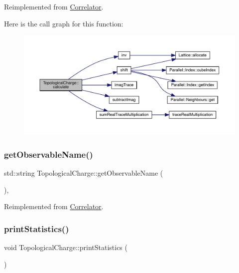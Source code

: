 Reimplemented from \mbox{\hyperlink{class_correlator_ab33502ff305f891c5c2e6d66a26a0247}{Correlator}}.

Here is the call graph for this function\+:\nopagebreak
\begin{figure}[H]
\begin{center}
\leavevmode
\includegraphics[width=350pt]{class_topological_charge_a8ed78c28c3484df04b1cb24187de2f5b_cgraph}
\end{center}
\end{figure}
\mbox{\label{class_topological_charge_ad12d246692f3d9ea0ef591814010ef88}} 
\subsubsection{\texorpdfstring{getObservableName()}{getObservableName()}}
{\footnotesize\ttfamily std\+::string Topological\+Charge\+::get\+Observable\+Name (\begin{DoxyParamCaption}{ }\end{DoxyParamCaption})\hspace{0.3cm}{\ttfamily [inline]}, {\ttfamily [virtual]}}



Reimplemented from \mbox{\hyperlink{class_correlator_ad1fa59e864917c3e48da037f90c3488f}{Correlator}}.

\mbox{\label{class_topological_charge_ad56263921d283d315b04ab40c9594a2c}} 
\subsubsection{\texorpdfstring{printStatistics()}{printStatistics()}}
{\footnotesize\ttfamily void Topological\+Charge\+::print\+Statistics (\begin{DoxyParamCaption}{ }\end{DoxyParamCaption})\hspace{0.3cm}{\ttfamily [virtual]}}



